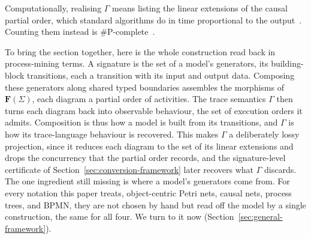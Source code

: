 Computationally, realising $\Gamma$ means listing the linear extensions of the
causal partial order, which standard algorithms do in time proportional to the
output~\cite{knuthArtComputerProgramming2011,ruskeyCombinatorialGeneration2003}.
Counting them instead is
$\#$P-complete~\cite{brightwellCountingLinearExtensions1991}.

To bring the section together, here is the whole construction read back in process-mining
terms. A signature is the set of a model's generators, its building-block transitions,
each a transition with its input and output data. Composing these generators along shared
typed boundaries assembles the morphisms of $\mathbf{F}(\Sigma)$, each
diagram a partial order of activities. The trace semantics $\Gamma$ then turns each diagram
back into observable behaviour, the set of execution orders it admits. Composition is thus
how a model is built from its transitions, and $\Gamma$ is how its trace-language
behaviour is recovered. This makes $\Gamma$ a deliberately lossy projection, since it reduces each diagram to the set of its linear extensions and drops the concurrency that the partial order records, and the signature-level certificate of Section~\ref{sec:conversion-framework} later recovers what $\Gamma$ discards. The one ingredient still missing is where a model's generators come
from. For every notation this paper treats, object-centric Petri nets, causal nets,
process trees, and BPMN, they are not chosen by hand but read off the model by a single
construction, the same for all four. We turn to it now (Section~\ref{sec:general-framework}).
